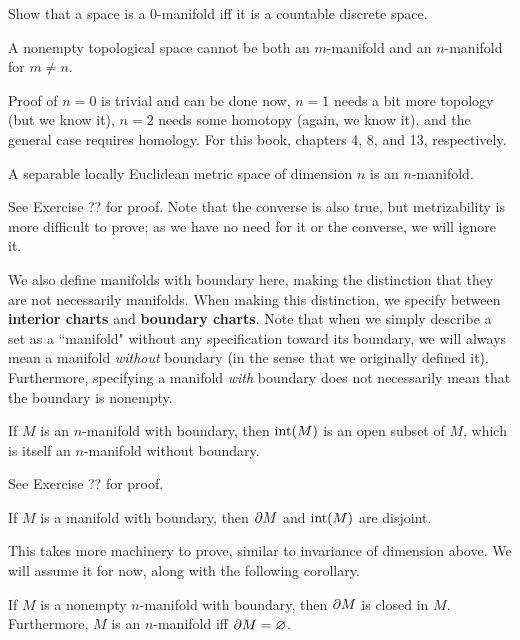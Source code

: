 \begin{exr}[source=Primary Source Material]
    Show that a space is a $ 0 $-manifold iff it is a countable discrete space.
\end{exr}

\begin{prop}[type=Theorem,title=Invariance of Dimension]
    A nonempty topological space cannot be both an $ m $-manifold and an
    $ n $-manifold for $ m \neq n $.
\end{prop}

Proof of $ n=0 $ is trivial and can be done now, $ n=1 $ needs a bit more
topology (but we know it), $ n=2 $ needs some homotopy (again, we know it), and
the general case requires homology. For this book, chapters 4, 8, and 13,
respectively.

\begin{prop}
    A separable locally Euclidean metric space of dimension $ n $ is an
    $ n $-manifold.
\end{prop}

See Exercise ?? for proof. Note that the converse is also true, but metrizability
is more difficult to prove; as we have no need for it or the converse, we will
ignore it.

We also define manifolds with boundary here, making the distinction that they are
not necessarily manifolds. When making this distinction, we specify between
\textbf{interior charts} and \textbf{boundary charts}. Note that when we simply
describe a set as a ``manifold" without any specification toward its boundary, we
will always mean a manifold \textit{without} boundary (in the sense that we
originally defined it). Furthermore, specifying a manifold \textit{with} boundary
does not necessarily mean that the boundary is nonempty.

\begin{prop}
    If $ M $ is an $ n $-manifold with boundary, then $ \operatorname{int}(M) $ is an open
    subset of $ M $, which is itself an $ n $-manifold without boundary.
\end{prop}

See Exercise ?? for proof.

\newpage
\begin{prop}[type=Theorem,title=Invariance of Boundary]
    If $ M $ is a manifold with boundary, then $ \partial M $ and $ \operatorname{int}(M) $ are
    disjoint.
\end{prop}

This takes more machinery to prove, similar to invariance of dimension above.
We will assume it for now, along with the following corollary.

\begin{crll}
    If $ M $ is a nonempty $ n $-manifold with boundary, then $ \partial M $ is closed
    in $ M $. Furthermore, $ M $ is an $ n $-manifold iff $ \partial M = \varnothing $.
\end{crll}

